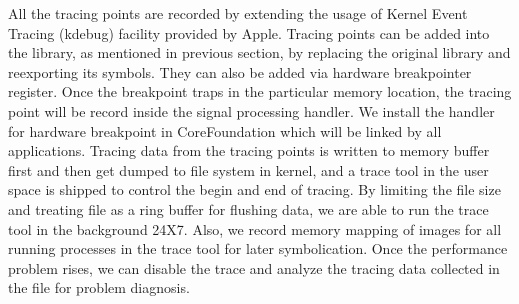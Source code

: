 All the tracing points are recorded by extending the usage of Kernel Event Tracing (kdebug) facility provided by Apple.
Tracing points can be added into the library, as mentioned in previous section, by replacing the original library and reexporting its symbols.
They can also be added via hardware breakpointer register.
Once the breakpoint traps in the particular memory location, the tracing point will be record inside the signal processing handler.
We install the handler for hardware breakpoint in CoreFoundation which will be linked by all applications.
Tracing data from the tracing points is written to memory buffer first and then get dumped to file system in kernel, and a trace tool in the user space is shipped to control the begin and end of tracing.
By limiting the file size and treating file as a ring buffer for flushing data, we are able to run the trace tool in the background 24X7.
Also, we record memory mapping of images for all running processes in the trace tool for later symbolication.
Once the performance problem rises, we can disable the trace and analyze the tracing data collected in the file for problem diagnosis.
